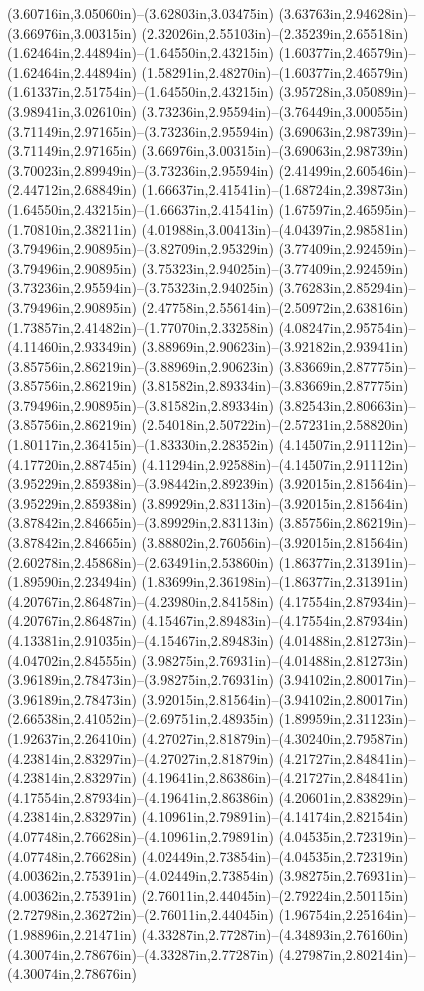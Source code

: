 (3.60716in,3.05060in)--(3.62803in,3.03475in) (3.63763in,2.94628in)--(3.66976in,3.00315in) (2.32026in,2.55103in)--(2.35239in,2.65518in) (1.62464in,2.44894in)--(1.64550in,2.43215in) (1.60377in,2.46579in)--(1.62464in,2.44894in) (1.58291in,2.48270in)--(1.60377in,2.46579in) (1.61337in,2.51754in)--(1.64550in,2.43215in) (3.95728in,3.05089in)--(3.98941in,3.02610in) (3.73236in,2.95594in)--(3.76449in,3.00055in) (3.71149in,2.97165in)--(3.73236in,2.95594in) (3.69063in,2.98739in)--(3.71149in,2.97165in) (3.66976in,3.00315in)--(3.69063in,2.98739in) (3.70023in,2.89949in)--(3.73236in,2.95594in) (2.41499in,2.60546in)--(2.44712in,2.68849in) (1.66637in,2.41541in)--(1.68724in,2.39873in) (1.64550in,2.43215in)--(1.66637in,2.41541in) (1.67597in,2.46595in)--(1.70810in,2.38211in) (4.01988in,3.00413in)--(4.04397in,2.98581in) (3.79496in,2.90895in)--(3.82709in,2.95329in) (3.77409in,2.92459in)--(3.79496in,2.90895in) (3.75323in,2.94025in)--(3.77409in,2.92459in) (3.73236in,2.95594in)--(3.75323in,2.94025in) (3.76283in,2.85294in)--(3.79496in,2.90895in) (2.47758in,2.55614in)--(2.50972in,2.63816in) (1.73857in,2.41482in)--(1.77070in,2.33258in) (4.08247in,2.95754in)--(4.11460in,2.93349in) (3.88969in,2.90623in)--(3.92182in,2.93941in) (3.85756in,2.86219in)--(3.88969in,2.90623in) (3.83669in,2.87775in)--(3.85756in,2.86219in) (3.81582in,2.89334in)--(3.83669in,2.87775in) (3.79496in,2.90895in)--(3.81582in,2.89334in) (3.82543in,2.80663in)--(3.85756in,2.86219in) (2.54018in,2.50722in)--(2.57231in,2.58820in) (1.80117in,2.36415in)--(1.83330in,2.28352in) (4.14507in,2.91112in)--(4.17720in,2.88745in) (4.11294in,2.92588in)--(4.14507in,2.91112in) (3.95229in,2.85938in)--(3.98442in,2.89239in) (3.92015in,2.81564in)--(3.95229in,2.85938in) (3.89929in,2.83113in)--(3.92015in,2.81564in) (3.87842in,2.84665in)--(3.89929in,2.83113in) (3.85756in,2.86219in)--(3.87842in,2.84665in) (3.88802in,2.76056in)--(3.92015in,2.81564in) (2.60278in,2.45868in)--(2.63491in,2.53860in) (1.86377in,2.31391in)--(1.89590in,2.23494in) (1.83699in,2.36198in)--(1.86377in,2.31391in) (4.20767in,2.86487in)--(4.23980in,2.84158in) (4.17554in,2.87934in)--(4.20767in,2.86487in) (4.15467in,2.89483in)--(4.17554in,2.87934in) (4.13381in,2.91035in)--(4.15467in,2.89483in) (4.01488in,2.81273in)--(4.04702in,2.84555in) (3.98275in,2.76931in)--(4.01488in,2.81273in) (3.96189in,2.78473in)--(3.98275in,2.76931in) (3.94102in,2.80017in)--(3.96189in,2.78473in) (3.92015in,2.81564in)--(3.94102in,2.80017in) (2.66538in,2.41052in)--(2.69751in,2.48935in) (1.89959in,2.31123in)--(1.92637in,2.26410in) (4.27027in,2.81879in)--(4.30240in,2.79587in) (4.23814in,2.83297in)--(4.27027in,2.81879in) (4.21727in,2.84841in)--(4.23814in,2.83297in) (4.19641in,2.86386in)--(4.21727in,2.84841in) (4.17554in,2.87934in)--(4.19641in,2.86386in) (4.20601in,2.83829in)--(4.23814in,2.83297in) (4.10961in,2.79891in)--(4.14174in,2.82154in) (4.07748in,2.76628in)--(4.10961in,2.79891in) (4.04535in,2.72319in)--(4.07748in,2.76628in) (4.02449in,2.73854in)--(4.04535in,2.72319in) (4.00362in,2.75391in)--(4.02449in,2.73854in) (3.98275in,2.76931in)--(4.00362in,2.75391in) (2.76011in,2.44045in)--(2.79224in,2.50115in) (2.72798in,2.36272in)--(2.76011in,2.44045in) (1.96754in,2.25164in)--(1.98896in,2.21471in) (4.33287in,2.77287in)--(4.34893in,2.76160in) (4.30074in,2.78676in)--(4.33287in,2.77287in) (4.27987in,2.80214in)--(4.30074in,2.78676in) 